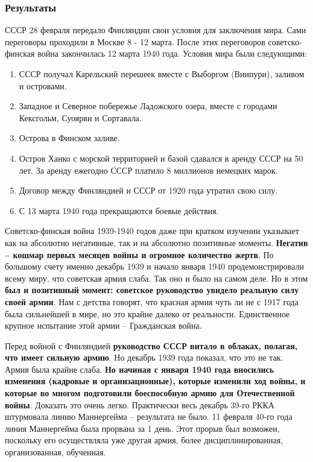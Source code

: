 \documentclass{article}
\begin{document}
\subsubsection{Результаты}

СССР 28 февраля передало Финляндии свои условия для заключения мира. Сами переговоры проходили в Москве 8 - 12 марта. После этих переговоров советско-финская война закончилась 12 марта 1940 года. Условия мира были следующими:

\begin{enumerate}
    \item СССР получал Карельский перешеек вместе с Выборгом (Виипури), заливом и островами.
    \item Западное и Северное побережье Ладожского озера, вместе с городами Кексгольм, Суоярви и Сортавала.
    \item Острова в Финском заливе.
    \item Остров Ханко с морской территорией и базой сдавался в аренду СССР на 50 лет. За аренду ежегодно СССР платило 8 миллионов немецких марок.
    \item Договор между Финляндией и СССР от 1920 года утратил свою силу.
    \item С 13 марта 1940 года прекращаются боевые действия.
\end{enumerate}

Советско-финская война 1939-1940 годов даже при кратком изучении указывает как на абсолютно негативные, так и на абсолютно позитивные моменты. \textbf{Негатив – кошмар первых месяцев войны и огромное количество жертв}. По большому счету именно декабрь 1939 и начало января 1940 продемонстрировали всему миру, что советская армия слаба. Так оно и было на самом деле. Но в этом \textbf{был и позитивный момент: советское руководство увидело реальную силу своей армии}. Нам с детства говорят, что красная армия чуть ли не с 1917 года была сильнейшей в мире, но это крайне далеко от реальности. Единственное крупное испытание этой армии – Гражданская война.

\hfill

Перед войной с Финляндией \textbf{руководство СССР витало в облаках, полагая, что имеет сильную армию}. Но декабрь 1939 года показал, что это не так. Армия была крайне слаба. \textbf{Но начиная с января 1940 года вносились изменения (кадровые и организационные), которые изменили ход войны, и которые во многом подготовили боеспособную армию для Отечественной войны}. Доказать это очень легко. Практически весь декабрь 39-го РККА штурмовала линию Маннергейма – результата не было. 11 февраля 40-го года линия Маннергейма была прорвана за 1 день. Этот прорыв был возможен, поскольку его осуществляла уже другая армия, более дисциплинированная, организованная, обученная.
\end{document}
